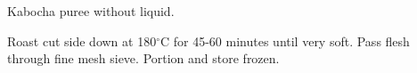 \documentclass[main]{subfiles}
\begin{document}
Kabocha puree without liquid.

\begin{rec}
Roast cut side down at 180$^\circ$C for 45-60 minutes until very soft.
\newstep
Pass flesh through fine mesh sieve. Portion and store frozen.
\end{rec}
\end{document}
